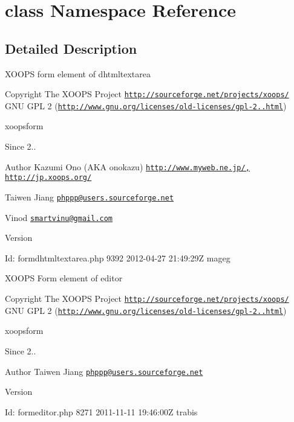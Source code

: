 \hypertarget{namespaceclass}{\section{class Namespace Reference}
\label{namespaceclass}
}


\subsection{Detailed Description}
X\-O\-O\-P\-S form element of dhtmltextarea

\begin{DoxyCopyright}{Copyright}
The X\-O\-O\-P\-S Project \href{http://sourceforge.net/projects/xoops/}{\tt http\-://sourceforge.\-net/projects/xoops/}  G\-N\-U G\-P\-L 2 (\href{http://www.gnu.org/licenses/old-licenses/gpl-2.0.html}{\tt http\-://www.\-gnu.\-org/licenses/old-\/licenses/gpl-\/2..\-html})
\end{DoxyCopyright}
xoopsform \begin{DoxySince}{Since}
2.. 
\end{DoxySince}
\begin{DoxyAuthor}{Author}
Kazumi Ono (A\-K\-A onokazu) \href{http://www.myweb.ne.jp/,}{\tt http\-://www.\-myweb.\-ne.\-jp/,} \href{http://jp.xoops.org/}{\tt http\-://jp.\-xoops.\-org/} 

Taiwen Jiang \href{mailto:phppp@users.sourceforge.net}{\tt phppp@users.\-sourceforge.\-net} 

Vinod \href{mailto:smartvinu@gmail.com}{\tt smartvinu@gmail.\-com} 
\end{DoxyAuthor}
\begin{DoxyVersion}{Version}

\end{DoxyVersion}
\begin{DoxyParagraph}{Id\-:}
formdhtmltextarea.\-php 9392 2012-\/04-\/27 21\-:49\-:29\-Z mageg 
\end{DoxyParagraph}


X\-O\-O\-P\-S Form element of editor

\begin{DoxyCopyright}{Copyright}
The X\-O\-O\-P\-S Project \href{http://sourceforge.net/projects/xoops/}{\tt http\-://sourceforge.\-net/projects/xoops/}  G\-N\-U G\-P\-L 2 (\href{http://www.gnu.org/licenses/old-licenses/gpl-2.0.html}{\tt http\-://www.\-gnu.\-org/licenses/old-\/licenses/gpl-\/2..\-html})
\end{DoxyCopyright}
xoopsform \begin{DoxySince}{Since}
2.. 
\end{DoxySince}
\begin{DoxyAuthor}{Author}
Taiwen Jiang \href{mailto:phppp@users.sourceforge.net}{\tt phppp@users.\-sourceforge.\-net} 
\end{DoxyAuthor}
\begin{DoxyVersion}{Version}

\end{DoxyVersion}
\begin{DoxyParagraph}{Id\-:}
formeditor.\-php 8271 2011-\/11-\/11 19\-:46\-:00\-Z trabis 
\end{DoxyParagraph}


